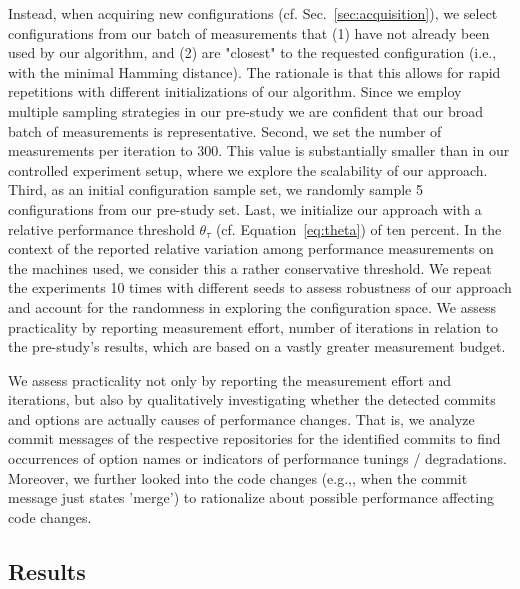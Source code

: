 \documentclass[sigconf]{acmart}
\begin{document}
	Instead, when acquiring new configurations (cf. Sec.~\ref{sec:acquisition}), we select configurations from our batch of measurements that (1) have not already been used by our algorithm, and (2) are "closest" to the requested configuration (i.e., with the minimal Hamming distance). The rationale is that this allows for rapid repetitions with different initializations of our algorithm. Since we employ multiple sampling strategies in our pre-study we are confident that our broad batch of measurements is representative. Second, we set the number of measurements per iteration to 300. This value is substantially smaller than in our controlled experiment setup, where we explore the scalability of our approach. Third, as an initial configuration sample set, we randomly sample 5 configurations from our pre-study set. 
	Last, we initialize our approach with a relative performance threshold $\theta_\tau$ (cf. Equation~\ref{eq:theta}) of ten percent. In the context of the reported relative variation among performance measurements on the machines used, we consider this a rather conservative threshold. 
	We repeat the experiments 10 times with different seeds to assess robustness of our approach and account for the randomness in exploring the configuration space.
	We assess practicality by reporting measurement effort, number of iterations in relation to the pre-study's results, which are based on a vastly greater measurement budget.
	
	We assess practicality not only by reporting the measurement effort and iterations, but also by qualitatively investigating whether the detected commits and options are actually causes of performance changes. That is, we analyze commit messages of the respective repositories for the identified commits to find occurrences of option names or indicators of performance tunings / degradations. Moreover, we further looked into the code changes (e.g.,, when the commit message just states 'merge') to rationalize about possible performance affecting code changes.
	
	\subsection{Results}	
\end{document}
